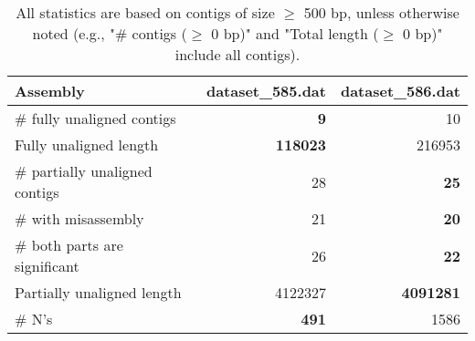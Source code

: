\documentclass[12pt,a4paper]{article}
\begin{document}
\begin{table}[ht]
\begin{center}
\caption{All statistics are based on contigs of size $\geq$ 500 bp, unless otherwise noted (e.g., "\# contigs ($\geq$ 0 bp)" and "Total length ($\geq$ 0 bp)" include all contigs).}
\begin{tabular}{|l*{2}{|r}|}
\hline
Assembly & dataset\_585.dat & dataset\_586.dat \\ \hline
\# fully unaligned contigs & {\bf 9} & 10 \\ \hline
Fully unaligned length & {\bf 118023} & 216953 \\ \hline
\# partially unaligned contigs & 28 & {\bf 25} \\ \hline
\hspace{5mm}\# with misassembly & 21 & {\bf 20} \\ \hline
\hspace{5mm}\# both parts are significant & 26 & {\bf 22} \\ \hline
Partially unaligned length & 4122327 & {\bf 4091281} \\ \hline
\# N's & {\bf 491} & 1586 \\ \hline
\end{tabular}
\end{center}
\end{table}
\end{document}
